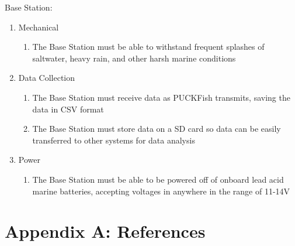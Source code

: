 \documentclass[12pt]{article}         %
\begin{document}
Base Station:
\begin{enumerate}
    \item Mechanical 
    \begin{enumerate}
        \item The Base Station must be able to withstand frequent splashes of saltwater, heavy rain, and other harsh marine conditions
    \end{enumerate}
    \item Data Collection
    \begin{enumerate}
        \item The Base Station must receive data as PUCKFish transmits, saving the data in CSV format
        \item The Base Station must store data on a SD card so data can be easily transferred to other systems for data analysis
    \end{enumerate}
    \item Power
    \begin{enumerate}
        \item The Base Station must be able to be powered off of onboard lead acid marine batteries, accepting voltages in anywhere in the range of 11-14V
    \end{enumerate}
\end{enumerate}

\section{Appendix A: References}  %

\parskip=0pt
\parsep=0pt



\end{document}
